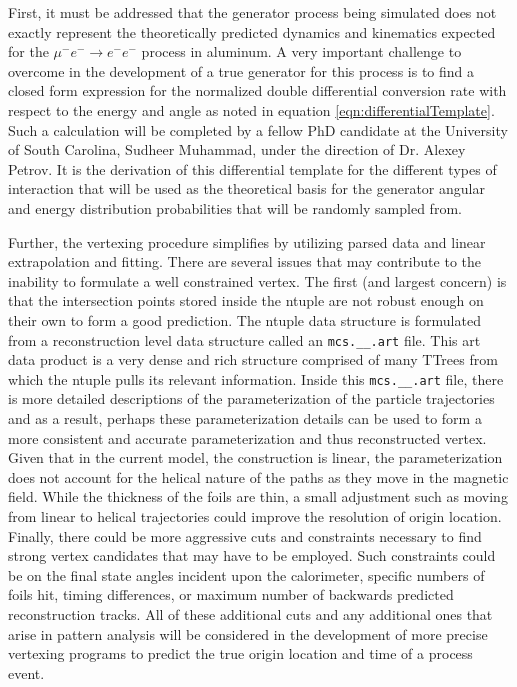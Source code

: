\documentclass[12pt]{article}
\newcommand{\muEtoEE}{\mu^- e^- \to e^- e^-}
\begin{document}
First, it must be addressed that the generator process being simulated does not exactly represent the theoretically predicted dynamics and kinematics expected for the $\muEtoEE$ process in aluminum. A very important challenge to overcome in the development of a true generator for this process is to find a closed form expression for the normalized double differential conversion rate with respect to the energy and angle as noted in equation \ref{eqn:differentialTemplate}. Such a calculation will be completed by a fellow PhD candidate at the University of South Carolina, Sudheer Muhammad, under the direction of Dr. Alexey Petrov. It is the derivation of this differential template for the different types of interaction that will be used as the theoretical basis for the generator angular and energy distribution probabilities that will be randomly sampled from.

Further, the vertexing procedure simplifies by utilizing parsed data and linear extrapolation and fitting. There are several issues that may contribute to the inability to formulate a well constrained vertex. The first (and largest concern) is that the intersection points stored inside the ntuple are not robust enough on their own to form a good prediction. The ntuple data structure is formulated from a reconstruction level data structure called an \verb|mcs.__.art| file. This art data product is a very dense and rich structure comprised of many TTrees from which the ntuple pulls its relevant information. Inside this \verb|mcs.__.art| file, there is more detailed descriptions of the parameterization of the particle trajectories and as a result, perhaps these parameterization details can be used to form a more consistent and accurate parameterization and thus reconstructed vertex. Given that in the current model, the construction is linear, the parameterization does not account for the helical nature of the paths as they move in the magnetic field. While the thickness of the foils are thin, a small adjustment such as moving from linear to helical trajectories could improve the resolution of origin location. Finally, there could be more aggressive cuts and constraints necessary to find strong vertex candidates that may have to be employed. Such constraints could be on the final state angles incident upon the calorimeter, specific numbers of foils hit, timing differences, or maximum number of backwards predicted reconstruction tracks. All of these additional cuts and any additional ones that arise in pattern analysis will be considered in the development of more precise vertexing programs to predict the true origin location and time of a process event.
\end{document}
